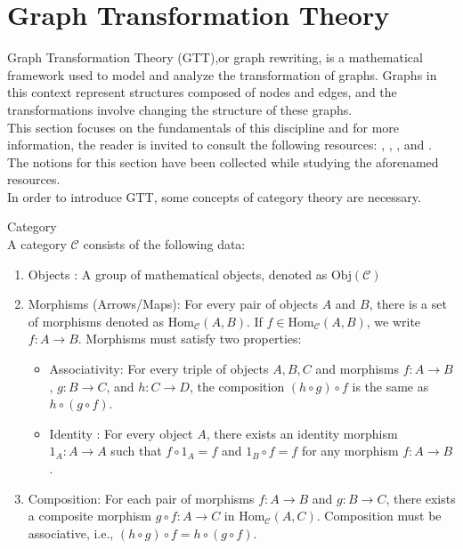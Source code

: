 \section{Graph Transformation Theory}
Graph Transformation Theory (GTT),or graph rewriting, is a mathematical framework used to model and analyze the transformation of graphs. Graphs in this context represent structures composed of nodes and edges, and the transformations involve changing the structure of these graphs.\\
This section focuses on the fundamentals of this discipline and for more information, the reader is invited to consult the following resources: \cite{HECKEL2006187}, \cite{handbook_of_gg}, \cite{essential_on_graph_theory}, \cite{2123-19534} and \cite{gtt_se}. The notions for this section have been collected while studying the aforenamed resources. \\
In order to introduce GTT, some concepts of category theory are necessary. \\

\begin{definition}{Category}\\
A category $\mathcal{C}$ consists of the following data:
\begin{enumerate}
	\item Objects : A group of mathematical objects, denoted as $\text{Obj}(\mathcal{C})$
	\item Morphisms (Arrows/Maps): For every pair of objects \(A\) and \(B\), there is a set of morphisms denoted as \(\text{Hom}_{\mathcal{C}}(A, B)\). If \(f \in \text{Hom}_{\mathcal{C}}(A, B)\), we write \(f: A \to B\). Morphisms must satisfy two properties:
	\begin{itemize}
		\item  Associativity: For every triple of objects \(A, B, C\) and morphisms \(f: A \to B\), \(g: B \to C\), and \(h: C \to D\), the composition \((h \circ g) \circ f\) is the same as \(h \circ (g \circ f)\).
		\item Identity : For every object \(A\), there exists an identity morphism \(1_A: A \to A\) such that \(f \circ 1_A = f\) and \(1_B \circ f = f\) for any morphism \(f: A \to B\).
	\end{itemize}
	\item Composition: For each pair of morphisms \(f: A \to B\) and \(g: B \to C\), there exists a composite morphism \(g \circ f: A \to C\) in \(\text{Hom}_{\mathcal{C}}(A, C)\). Composition must be associative, i.e., \((h \circ g) \circ f = h \circ (g \circ f)\).
\end{enumerate}
\end{definition}




